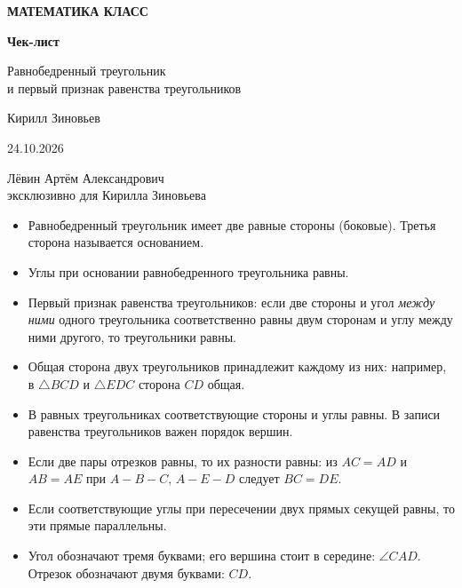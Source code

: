 \documentclass[a4paper,12pt]{article}
\renewcommand{\today}{24.10.2026}
\newcommand{\mysection}[1]{\vspace{3pt}\noindent{\large\bfseries\color{darkaccent}#1}\par\vspace{2pt}}
\newcommand{\pointitem}[1]{\item[\(\square\)] #1}
\newcommand{\ang}[1]{\angle #1}
\begin{document}
\thispagestyle{empty}
\begin{center}
\vspace*{33mm}
{\small\color{accent}\bfseries МАТЕМАТИКА \;\textbullet{} КЛАСС}\par\vspace{15mm}
{\Huge\bfseries\color{darkaccent} Чек-лист}\par\vspace{9mm}
{\LARGE Равнобедренный треугольник\\[2mm]
и первый признак равенства треугольников}\par\vspace{20mm}
{\large Кирилл Зиновьев}\par\vspace{8mm}
{\normalsize \today}\par\vfill
{\small Лёвин Артём Александрович\\[2mm]
эксклюзивно для Кирилла Зиновьева}\par\vspace{11mm}
\end{center}
\clearpage

\mysection{1. Что необходимо знать}
\begin{itemize}[label={}]
\pointitem{Равнобедренный треугольник имеет две равные стороны (боковые). Третья сторона называется основанием.}
\pointitem{Углы при основании равнобедренного треугольника равны.}
\pointitem{Первый признак равенства треугольников: если две стороны и угол \emph{между ними} одного треугольника соответственно равны двум сторонам и углу между ними другого, то треугольники равны.}
\pointitem{Общая сторона двух треугольников принадлежит каждому из них: например, в $\triangle BCD$ и $\triangle EDC$ сторона $CD$ общая.}
\pointitem{В равных треугольниках соответствующие стороны и углы равны. В записи равенства треугольников важен порядок вершин.}
\pointitem{Если две пары отрезков равны, то их разности равны: из $AC=AD$ и $AB=AE$ при $A-B-C$, $A-E-D$ следует $BC=DE$.}
\pointitem{Если соответствующие углы при пересечении двух прямых секущей равны, то эти прямые параллельны.}
\pointitem{Угол обозначают тремя буквами; его вершина стоит в середине: $\ang{CAD}$. Отрезок обозначают двумя буквами: $CD$.}
\end{itemize}
\end{document}
